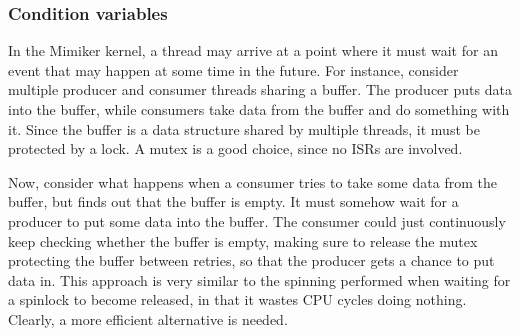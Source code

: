 \documentclass[shortabstract, manyadvisors, english, mgr]{iithesis}
\begin{document}

\subsubsection*{Condition variables}

In the Mimiker kernel, a thread may arrive at a point where it must wait for an
event that may happen at some time in the future. For instance, consider
multiple producer and consumer threads sharing a buffer. The producer puts data
into the buffer, while consumers take data from the buffer and do something with
it. Since the buffer is a data structure shared by multiple threads, it must be
protected by a lock. A mutex is a good choice, since no ISRs are involved.

Now, consider what happens when a consumer tries to take some data from the
buffer, but finds out that the buffer is empty. It must somehow wait for a
producer to put some data into the buffer. The consumer could just continuously
keep checking whether the buffer is empty, making sure to release the mutex
protecting the buffer between retries, so that the producer gets a chance to put
data in. This approach is very similar to the spinning performed when waiting
for a spinlock to become released, in that it wastes CPU cycles doing nothing.
Clearly, a more efficient alternative is needed.
\end{document}
